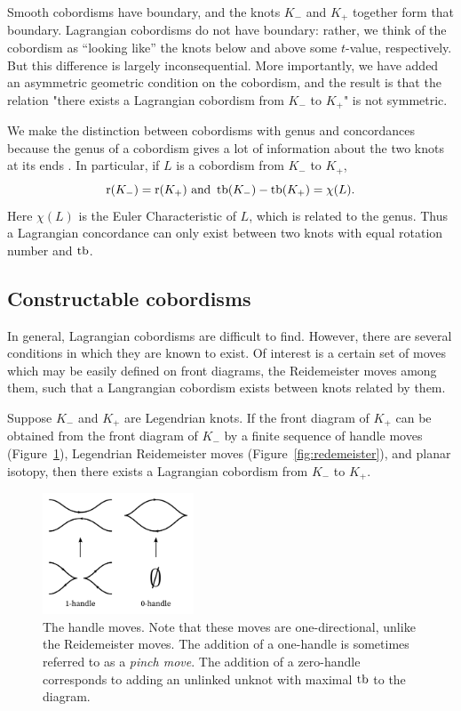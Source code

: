 Smooth cobordisms have boundary, and the knots $K_-$ and $K_+$ together form that boundary. Lagrangian cobordisms do not have boundary: rather, we think of the cobordism as ``looking like'' the knots below and above some $t$-value, respectively. But this difference is largely inconsequential.
More importantly, we have added an asymmetric geometric condition on the cobordism, and the result is that the relation "there exists a Lagrangian cobordism from $K_-$ to $K_+$" is not symmetric.

We make the distinction between cobordisms with genus and concordances because the genus of a cobordism gives a lot of information about the two knots at its ends \cite{chantraine2010}. In particular, if $L$ is a cobordism from $K_-$ to $K_+$,
\[
    \operatorname{r}(K_-) = \operatorname{r}(K_+) \text{     and     } \operatorname{tb}(K_-) - \operatorname{tb}(K_+) = \chi(L).
\]
Here $\chi(L)$ is the Euler Characteristic of $L$, which is related to the genus.
Thus a Lagrangian concordance can only exist between two knots with equal rotation number and $\operatorname{tb}$.


\subsection{Constructable cobordisms}

In general, Lagrangian cobordisms are difficult to find. However, there are several conditions in which they are known to exist. Of interest is a certain set of moves which may be easily defined on front diagrams, the Reidemeister moves among them, such that a Langrangian cobordism exists between knots related by them.

\begin{theorem}
    Suppose $K_-$ and $K_+$ are Legendrian knots. If the front diagram of $K_+$ can be obtained from the front diagram of $K_-$ by a finite sequence of handle moves (Figure~\ref{fig:handles}), Legendrian Reidemeister moves (Figure~\ref{fig:redemeister}), and planar isotopy, then there exists a Lagrangian cobordism from $K_-$ to $K_+$. 
\end{theorem}
\begin{figure}[ht!]
    \centering
    \includegraphics[width=0.4\textwidth]{images/handles.pdf}
    \caption{The handle moves. Note that these moves are one-directional, unlike the Reidemeister moves. The addition of a one-handle is sometimes referred to as a \emph{pinch move}. The addition of a zero-handle corresponds to adding an unlinked unknot with maximal $\operatorname{tb}$ to the diagram.}
    \label{fig:handles}
\end{figure}

